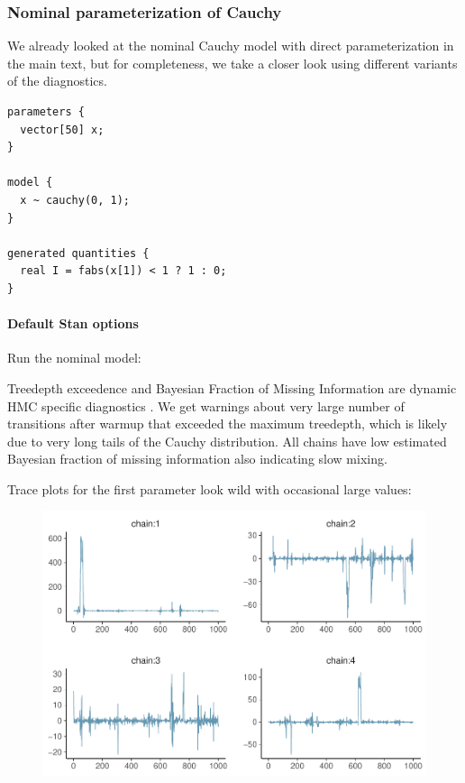 \documentclass[american,]{article}
\let\oldparagraph\paragraph
\renewcommand{\paragraph}[1]{\oldparagraph{#1}\mbox{}}
\begin{document}
\hypertarget{nominal-parameterization-of-cauchy-1}{%
\subsubsection*{Nominal parameterization of
Cauchy}\label{nominal-parameterization-of-cauchy-1}}

We already looked at the nominal Cauchy model with direct
parameterization in the main text, but for completeness, we take a
closer look using different variants of the diagnostics.

\begin{verbatim}
parameters {
  vector[50] x;
}

model {
  x ~ cauchy(0, 1);
}

generated quantities {
  real I = fabs(x[1]) < 1 ? 1 : 0;
}
\end{verbatim}

\hypertarget{default-stan-options-1}{%
\paragraph{Default Stan options}\label{default-stan-options-1}}

Run the nominal model:

Treedepth exceedence and Bayesian Fraction of Missing Information are
dynamic HMC specific diagnostics \citep{betancourt2017conceptual}. We
get warnings about very large number of transitions after warmup that
exceeded the maximum treedepth, which is likely due to very long tails
of the Cauchy distribution. All chains have low estimated Bayesian
fraction of missing information also indicating slow mixing.

Trace plots for the first parameter look wild with occasional large
values:

\begin{figure}[tp]
  \centering
  \includegraphics[width=0.6\linewidth]{graphics/trace-fit-nom-1.pdf}
\end{figure}
\end{document}
